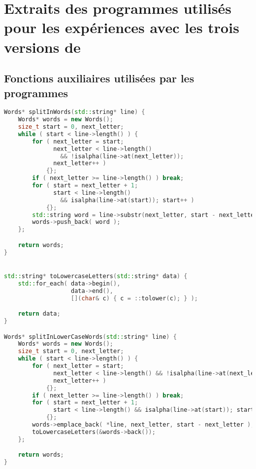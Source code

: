 \chapter{Extraits des programmes utilisés pour les expériences avec les trois versions de }
\label{appendice-code-wordcount-sf.ann}

\section{Fonctions auxiliaires utilisées par les programmes}

\begin{lstlisting}[basicstyle=\ttfamily\footnotesize,language=c++]
Words* splitInWords(std::string* line) {
    Words* words = new Words();
    size_t start = 0, next_letter;
    while ( start < line->length() ) {
        for ( next_letter = start;
              next_letter < line->length()
                && !isalpha(line->at(next_letter));
              next_letter++ )
            {};
        if ( next_letter >= line->length() ) break;
        for ( start = next_letter + 1;
              start < line->length()
                && isalpha(line->at(start)); start++ )
            {};
        std::string word = line->substr(next_letter, start - next_letter); 
        words->push_back( word );
    };

    return words;
}


std::string* toLowercaseLetters(std::string* data) {
    std::for_each( data->begin(),
                   data->end(),
                   [](char& c) { c = ::tolower(c); } );

    return data;
}

Words* splitInLowerCaseWords(std::string* line) {
    Words* words = new Words();
    size_t start = 0, next_letter;
    while ( start < line->length() ) {
        for ( next_letter = start;
              next_letter < line->length() && !isalpha(line->at(next_letter));
              next_letter++ )
            {};
        if ( next_letter >= line->length() ) break;
        for ( start = next_letter + 1;
              start < line->length() && isalpha(line->at(start)); start++ )
            {};
        words->emplace_back( *line, next_letter, start - next_letter );
        toLowercaseLetters(&words->back());
    };

    return words;
}
\end{lstlisting}


